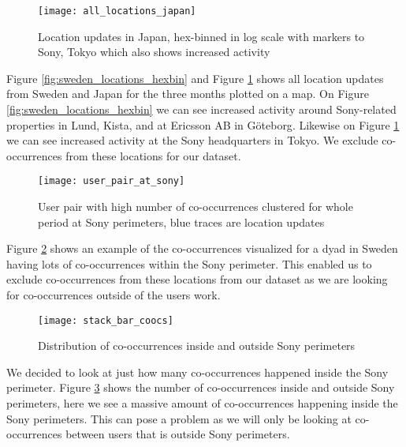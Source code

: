 \begin{figure}[H]
    \hspace*{-1.0cm}
    \centering
    \texttt{[image: all\_locations\_japan]}
    \caption{Location updates in Japan, hex-binned in log scale with markers to Sony, Tokyo which also shows increased activity}
    \label{fig:japan_locations_hexbin}
\end{figure}
Figure \ref{fig:sweden_locations_hexbin} and Figure \ref{fig:japan_locations_hexbin} shows all location updates from Sweden and Japan for the three months plotted on a map. On Figure \ref{fig:sweden_locations_hexbin} we can see increased activity around Sony-related properties in Lund\cite{sony_headquarters_sweden_lund}, Kista\cite{sony_headquarters_sweden_kista}, and at Ericsson AB in Göteborg\cite{ericsson}. Likewise on Figure \ref{fig:japan_locations_hexbin} we can see increased activity at the Sony headquarters\cite{sony_headquarters_japan} in Tokyo. We exclude co-occurrences from these locations for our dataset.

\begin{figure}[H]
    \hspace*{-1.0cm}
    \centering
    \texttt{[image: user\_pair\_at\_sony]}
    \caption{User pair with high number of co-occurrences clustered for whole period at Sony perimeters, blue traces are location updates}
    \label{fig:user_pair_at_sony}
\end{figure}
Figure \ref{fig:user_pair_at_sony} shows an example of the co-occurrences visualized for a dyad in Sweden having lots of co-occurrences within the Sony perimeter. This enabled us to exclude co-occurrences from these locations from our dataset as we are looking for co-occurrences outside of the users work.


\begin{figure}[H]
    \hspace*{-1.0cm}
    \centering
    \texttt{[image: stack\_bar\_coocs]}
    \caption{Distribution of co-occurrences inside and outside Sony perimeters}
    \label{fig:dist_coocs_sony}
\end{figure}

We decided to look at just how many co-occurrences happened inside the Sony perimeter. Figure \ref{fig:dist_coocs_sony} shows the number of co-occurrences inside and outside Sony perimeters, here we see a massive amount of co-occurrences happening inside the Sony perimeters. This can pose a problem as we will only be looking at co-occurrences between users that is outside Sony perimeters.

